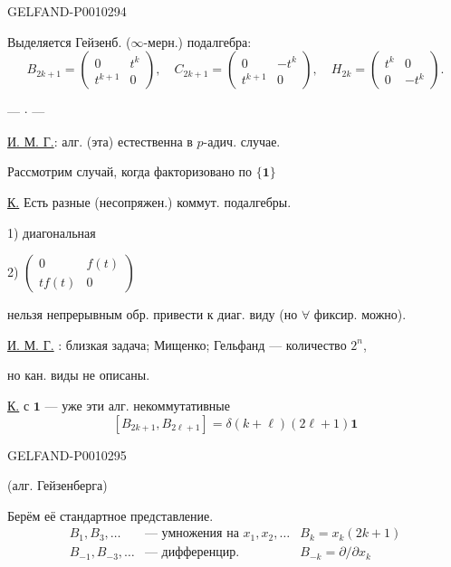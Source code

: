 \begin{GelfandAdjacentEvidence}{GELFAND-P001029}{4}


Выделяется Гейзенб. (\(\infty\)-мерн.) подалгебра:
\begin{equation*}
B_{2k+1}=\begin{pmatrix}0&t^k\\t^{k+1}&0\end{pmatrix},\quad
C_{2k+1}=\begin{pmatrix}0&-t^k\\t^{k+1}&0\end{pmatrix},\quad
H_{2k}=\begin{pmatrix}t^k&0\\0&-t^k\end{pmatrix}.
\tag{5}
\end{equation*}

\begin{center}--- $\cdot$ ---\end{center}

\underline{И. М. Г.}: алг. (эта) естественна в \(p\)-адич. случае.

Рассмотрим случай, когда факторизовано по $\{\mathbf1\}$

\underline{К.} Есть разные (несопряжен.) коммут. подалгебры.

1) диагональная

2) $\begin{pmatrix}0&f(t)\\tf(t)&0\end{pmatrix}$

нельзя непрерывным обр. привести к диаг. виду (но \(\forall\) фиксир. можно).

\underline{И. М. Г.} : близкая задача; \quad Мищенко; Гельфанд --- количество $2^n$,

\hspace{5em}но кан. виды не описаны.

\underline{К.} с \(\mathbf1\) --- уже эти алг. некоммутативные
\[
[B_{2k+1},B_{2\ell+1}]=\delta(k+\ell)(2\ell+1)\mathbf1
\]
\end{GelfandAdjacentEvidence}
\begin{GelfandAdjacentEvidence}{GELFAND-P001029}{5}


(алг. Гейзенберга)

Берём её стандартное представление.
\[
\begin{array}{ll||l}
B_1,B_3,\ldots & \text{--- умножения на }x_1,x_2,\ldots & B_k=x_k(2k+1)\\
B_{-1},B_{-3},\ldots & \text{--- дифференцир.} & B_{-k}=\partial/\partial x_k
\end{array}
\]
\end{GelfandAdjacentEvidence}

